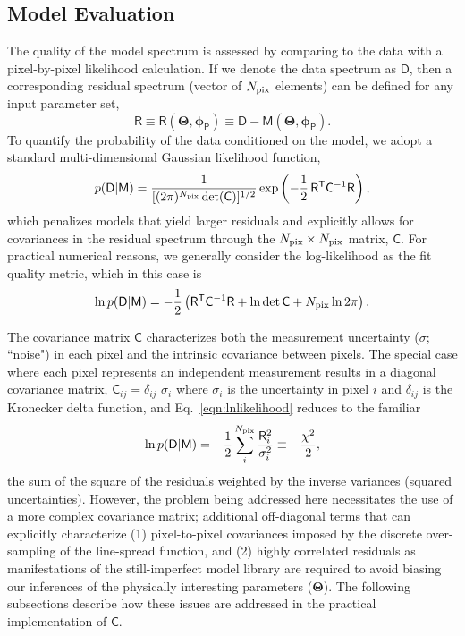 \documentclass[iop,floatfix]{emulateapj}
\newcommand{\vM}{\mathsf{M}}
\newcommand{\vD}{\mathsf{D}}
\newcommand{\vR}{\mathsf{R}}
\newcommand{\vC}{\mathsf{C}}
\newcommand{\trans}{\mathsf{T}}
\newcommand{\vT}{ {\bm \Theta}}
\newcommand{\vp}{ {\bm \phi}}
\newcommand{\cheb}{ \vp_{\mathsf{P}}}
\begin{document}
\subsection{Model Evaluation} \label{subsec:likelihood}

The quality of the model spectrum is assessed by comparing to the data with a pixel-by-pixel 
likelihood calculation.  If we denote the data spectrum as $\vD$, then a corresponding residual 
spectrum (vector of $N_{\rm pix}$ elements) can be defined for any input parameter set,
\begin{equation}
\vR \equiv \vR(\vT, \cheb) \equiv \vD-\vM(\vT, \cheb).
\end{equation}
To quantify the probability of the data conditioned on the model, we adopt a standard 
multi-dimensional Gaussian likelihood function,
\begin{equation}
p(\vD|\vM) =  \frac{1}{[(2 \pi)^{N_{\rm pix}} \det(\vC)]^{1/2}} \exp\left ( -\frac{1}{2} \,
   \vR^\trans \vC^{-1} \vR \right ), 
   \label{eqn:likelihood}
\end{equation}
which penalizes models that yield larger residuals and explicitly allows for covariances in the 
residual spectrum through the $N_{\rm pix} \times N_{\rm pix}$ matrix, $\vC$.  For practical 
numerical reasons, we generally consider the log-likelihood as the fit quality metric, which in 
this case is
\begin{equation}
  \ln{p(\vD | \vM)} = -\frac{1}{2} \left( \vR^\trans \vC^{-1} \vR + \ln{\det{\vC}} + N_{\rm pix} \ln{2\pi} \right).
  \label{eqn:lnlikelihood}
\end{equation}

The covariance matrix $\vC$ characterizes both the measurement uncertainty ($\sigma$; ``noise") in 
each pixel and the intrinsic covariance between pixels.  The special case where each pixel 
represents an independent measurement results in a diagonal covariance matrix, $\vC_{ij} = 
\delta_{ij} \,\, \sigma_i$ where $\sigma_i$ is the uncertainty in pixel $i$ and $\delta_{ij}$ is 
the Kronecker delta function, and Eq.~\ref{eqn:lnlikelihood} reduces to the familiar
\begin{equation}
\ln{p(\vD | \vM)} = -\frac{1}{2} \sum_i^{N_{\rm pix}} \frac{\vR_i^2}{\sigma_i^2} \equiv -\frac{\chi^2}{2},
\label{eqn:chisq}
\end{equation}
the sum of the square of the residuals weighted by the inverse variances (squared uncertainties).  
However, the problem being addressed here necessitates the use of a more complex covariance matrix; 
additional off-diagonal terms that can explicitly characterize (1) pixel-to-pixel covariances 
imposed by the discrete over-sampling of the line-spread function, and (2) highly correlated 
residuals as manifestations of the still-imperfect model library are required to avoid biasing our 
inferences of the physically interesting parameters ($\vT$).  The following subsections describe 
how these issues are addressed in the practical implementation of $\vC$.  
\end{document}
